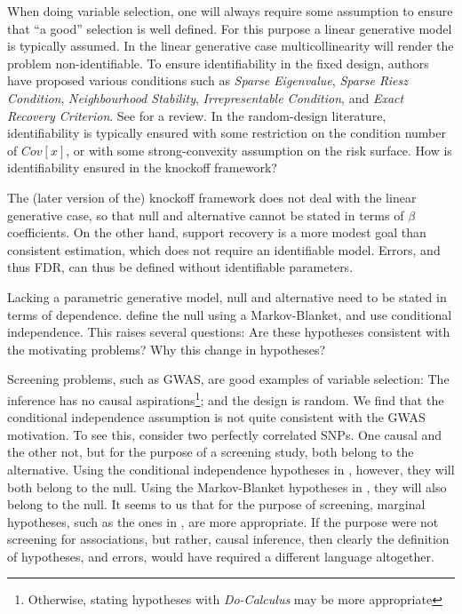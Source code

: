 \documentclass[article,lineno]{biometrika}
\begin{document}
When doing variable selection, one will always require some assumption to ensure that ``a good'' selection is well defined. 
For this purpose a linear generative model is typically assumed. 
In the linear generative case multicollinearity will render the problem non-identifiable. 
To ensure identifiability in the fixed design, authors have proposed various conditions such as \emph{Sparse Eigenvalue}, \emph{Sparse Riesz Condition}, \emph{Neighbourhood Stability}, \emph{Irrepresentable Condition}, and \emph{Exact Recovery Criterion}. 
See \citet[Sec 3.1.1]{MeinshausenStabilityselection2010} for a review. 
In the random-design literature, identifiability is typically ensured with some restriction on the condition number of $Cov[x]$, or with some strong-convexity assumption on the risk surface. 
How is identifiability ensured in the knockoff framework? 

The (later version of the) knockoff framework does not deal with the linear generative case, so that null and alternative cannot be stated in terms of $\beta$ coefficients. 
On the other hand, support recovery is a more modest goal than consistent estimation, which does not require an identifiable model. 
Errors, and thus FDR, can thus be defined without identifiable parameters. 

Lacking a parametric generative model, null and alternative need to be stated in terms of dependence. 
\citet{CandesPanninggoldmodelX2018} define the null using a Markov-Blanket, and \cite{SesiaGenehuntinghidden} use conditional independence. 
This raises several questions:
Are these hypotheses consistent with the motivating problems?
Why this change in hypotheses?

Screening problems, such as GWAS, are good examples of variable selection:
The inference has no causal aspirations\footnote{Otherwise, stating hypotheses with \emph{Do-Calculus} \citep{pearl1995causal} may be more appropriate};
and the design is random.
We find that the conditional independence assumption is not quite consistent with the GWAS motivation. 
To see this, consider two perfectly correlated SNPs. 
One causal and the other not, but for the purpose of a screening study, both belong to the alternative. 
Using the conditional independence hypotheses in \cite{SesiaGenehuntinghidden}, however, they will both belong to the null. 
Using the Markov-Blanket hypotheses in \cite{CandesPanninggoldmodelX2018}, they will also belong to the null. 
It seems to us that for the purpose of screening, marginal hypotheses, such as the ones in \cite{TusherSignificanceanalysismicroarrays2001}, are more appropriate. 
If the purpose were not screening for associations, but rather, causal inference, then clearly the definition of hypotheses, and errors, would have required a different language altogether. 
\end{document}
